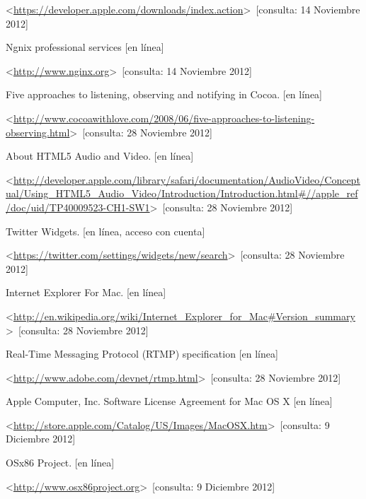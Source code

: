 \begin{thebibliography}{99}
\begin{sloppypar}
\textless \url{https://developer.apple.com/downloads/index.action}\textgreater \ [consulta: 14 Noviembre 2012]

%
Ngnix professional services [en línea]\

\textless \url{http://www.nginx.org}\textgreater \ [consulta: 14 Noviembre 2012]

%
Five approaches to listening, observing and notifying in Cocoa. [en línea]\

\textless \url{http://www.cocoawithlove.com/2008/06/five-approaches-to-listening-observing.html}\textgreater \ [consulta: 28 Noviembre 2012]

%
About HTML5 Audio and Video. [en línea]\

\textless \url{http://developer.apple.com/library/safari/documentation/AudioVideo/Conceptual/Using_HTML5_Audio_Video/Introduction/Introduction.html\#//apple_ref/doc/uid/TP40009523-CH1-SW1}\textgreater \ [consulta: 28 Noviembre 2012]

%
Twitter Widgets. [en línea, acceso con cuenta]\

\textless \url{https://twitter.com/settings/widgets/new/search}\textgreater \ [consulta: 28 Noviembre 2012]

%
Internet Explorer For Mac. [en línea]\

\textless \url{http://en.wikipedia.org/wiki/Internet_Explorer_for_Mac\#Version_summary}\textgreater \ [consulta: 28 Noviembre 2012]

%
Real-Time Messaging Protocol (RTMP) specification [en línea]\

\textless \url{http://www.adobe.com/devnet/rtmp.html}\textgreater \ [consulta: 28 Noviembre 2012]

%
Apple Computer, Inc. Software License Agreement for Mac OS X [en línea]\

\textless \url{http://store.apple.com/Catalog/US/Images/MacOSX.htm}\textgreater \ [consulta: 9 Diciembre 2012]

%
OSx86 Project. [en línea]\

\textless \url{http://www.osx86project.org}\textgreater \ [consulta: 9 Diciembre 2012]


\end{sloppypar}
\end{thebibliography}
